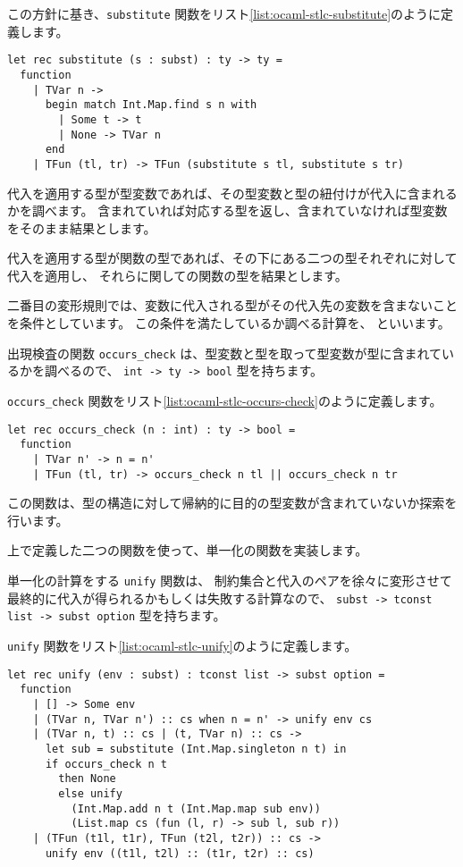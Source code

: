 この方針に基き、\texttt{substitute} 関数をリスト\ref{list:ocaml-stlc-substitute}のように定義します。

\begin{lstlisting}[caption=代入, label=list:ocaml-stlc-substitute]
let rec substitute (s : subst) : ty -> ty =
  function
    | TVar n ->
      begin match Int.Map.find s n with
        | Some t -> t
        | None -> TVar n
      end
    | TFun (tl, tr) -> TFun (substitute s tl, substitute s tr)
\end{lstlisting}

代入を適用する型が型変数であれば、その型変数と型の紐付けが代入に含まれるかを調べます。
含まれていれば対応する型を返し、含まれていなければ型変数をそのまま結果とします。

代入を適用する型が関数の型であれば、その下にある二つの型それぞれに対して代入を適用し、
それらに関しての関数の型を結果とします。

二番目の変形規則では、変数に代入される型がその代入先の変数を含まないことを条件としています。
この条件を満たしているか調べる計算を、 といいます。

出現検査の関数 \texttt{occurs\_check} は、型変数と型を取って型変数が型に含まれているかを調べるので、
\texttt{int -> ty -> bool} 型を持ちます。

\texttt{occurs\_check} 関数をリスト\ref{list:ocaml-stlc-occurs-check}のように定義します。

\begin{lstlisting}[caption=出現検査, label=list:ocaml-stlc-occurs-check]
let rec occurs_check (n : int) : ty -> bool =
  function
    | TVar n' -> n = n'
    | TFun (tl, tr) -> occurs_check n tl || occurs_check n tr
\end{lstlisting}

この関数は、型の構造に対して帰納的に目的の型変数が含まれていないか探索を行います。

上で定義した二つの関数を使って、単一化の関数を実装します。

単一化の計算をする \texttt{unify} 関数は、
制約集合と代入のペアを徐々に変形させて最終的に代入が得られるかもしくは失敗する計算なので、
\texttt{subst -> tconst list -> subst option} 型を持ちます。

\texttt{unify} 関数をリスト\ref{list:ocaml-stlc-unify}のように定義します。

\begin{lstlisting}[caption=単一化, label=list:ocaml-stlc-unify]
let rec unify (env : subst) : tconst list -> subst option =
  function
    | [] -> Some env
    | (TVar n, TVar n') :: cs when n = n' -> unify env cs
    | (TVar n, t) :: cs | (t, TVar n) :: cs ->
      let sub = substitute (Int.Map.singleton n t) in
      if occurs_check n t
        then None
        else unify
          (Int.Map.add n t (Int.Map.map sub env))
          (List.map cs (fun (l, r) -> sub l, sub r))
    | (TFun (t1l, t1r), TFun (t2l, t2r)) :: cs ->
      unify env ((t1l, t2l) :: (t1r, t2r) :: cs)
\end{lstlisting}


